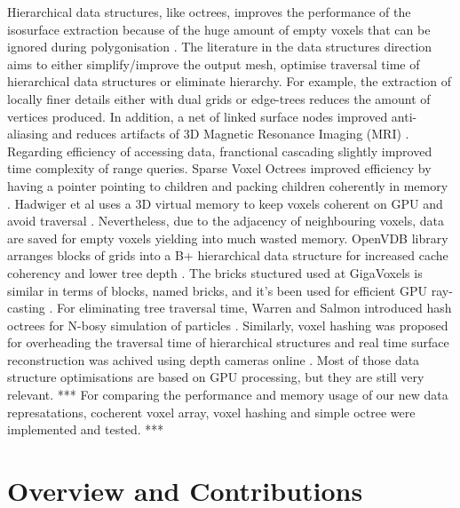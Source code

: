 \documentclass{subfiles}
\begin{document}
\par {\color{blue}Hierarchical data structures, like octrees, improves the performance of the isosurface extraction because of the huge amount of empty voxels that can be ignored during polygonisation \cite{Wilhelms1990}. The literature in the data structures direction aims to either simplify/improve the output mesh, optimise traversal time of hierarchical data structures or eliminate hierarchy. For example, the extraction of locally finer details either with dual grids \cite{Scott2005} or edge-trees \cite{Wilhelms1992} reduces the amount of vertices produced. In addition, a net of linked surface nodes improved anti-aliasing and reduces artifacts of 3D Magnetic Resonance Imaging (MRI) \cite{Gibson1998}. Regarding efficiency of accessing data, } franctional cascading slightly improved time complexity of range queries\cite{Chazelle1986}. Sparse Voxel Octrees improved efficiency by having a pointer pointing to children and packing children coherently in memory \cite{Laine2011SparseOctrees}. Hadwiger et al uses a 3D virtual memory to keep voxels coherent on GPU and avoid traversal \cite{Hadwiger2012}. Nevertheless, due to the adjacency of neighbouring voxels, data are saved for empty voxels yielding into much wasted memory. OpenVDB library arranges blocks of grids into a B+ hierarchical data structure for increased cache coherency and lower tree depth \cite{Museth2013OpenVDB}. The bricks stuctured used at GigaVoxels is similar in terms of blocks, named bricks, and it's been used for efficient GPU ray-casting \cite{Crassin2009}. For eliminating tree traversal time, Warren and Salmon introduced hash octrees for N-bosy simulation of particles \cite{Warren1993hashedOctree}. Similarly, voxel hashing was proposed for overheading the traversal time of hierarchical structures and real time surface reconstruction was achived using depth cameras online \cite{Nievner2016voxelHashing}. Most of those data structure optimisations are based on GPU processing, but they are still very relevant. *** For comparing the performance and memory usage of our new data represatations, cocherent voxel array, voxel hashing and simple octree were implemented and tested. ***


\section{Overview and Contributions}

\end{document}
